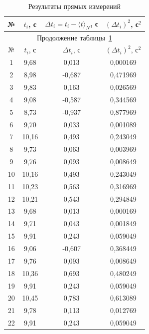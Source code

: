 \documentclass[a4paper,14pt]{extarticle}
\begin{document}
	\begingroup
	\small
	\renewcommand{\arraystretch}{1.25}
	\begin{longtable}{|c|c|c|c|}
		\caption{Результаты прямых измерений}
		\label{tab:data}\\ \hline
		№ & $t_i$, с & $\Delta t_i = t_i - \langle t \rangle_N$, с & $(\Delta t_i)^2$, с$^2$ \\ \hline
		\endfirsthead
		
		\multicolumn{4}{c}{Продолжение таблицы~\ref{tab:data}} \\ \hline
		№ & $t_i$, с & $\Delta t_i$, с & $(\Delta t_i)^2$, с$^2$ \\ \hline
		\endhead
		
		\hline
		\endfoot
		
		\hline
		\endlastfoot
		
		1  & 9,68  & 0,013  & 0,000169 \\ \hline
		2  & 8,98  & -0,687 & 0,471969 \\ \hline
		3  & 9,83  & 0,163  & 0,026569 \\ \hline
		4  & 9,08  & -0,587 & 0,344569 \\ \hline
		5  & 8,73  & -0,937 & 0,877969 \\ \hline
		6  & 9,70  & 0,033  & 0,001089 \\ \hline
		7  & 10,16 & 0,493  & 0,243049 \\ \hline
		8  & 9,73  & 0,063  & 0,003969 \\ \hline
		9  & 9,76  & 0,093  & 0,008649 \\ \hline
		10 & 10,16 & 0,493  & 0,243049 \\ \hline
		11 & 10,23 & 0,563  & 0,316969 \\ \hline
		12 & 10,21 & 0,543  & 0,294849 \\ \hline
		13 & 9,68  & 0,013  & 0,000169 \\ \hline
		14 & 9,71  & 0,043  & 0,001849 \\ \hline
		15 & 9,91  & 0,243  & 0,059049 \\ \hline
		16 & 9,06  & -0,607 & 0,368449 \\ \hline
		17 & 9,76  & 0,093  & 0,008649 \\ \hline
		18 & 10,36 & 0,693  & 0,480249 \\ \hline
		19 & 9,91  & 0,243  & 0,059049 \\ \hline
		20 & 10,45 & 0,783  & 0,613089 \\ \hline
		21 & 9,78  & 0,113  & 0,012769 \\ \hline
		22 & 9,91  & 0,243  & 0,059049 \\ \hline

\end{longtable}
\end{document}
